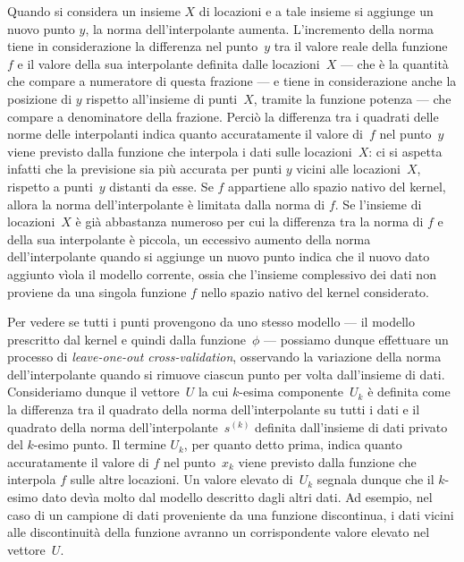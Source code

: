 Quando si considera un insieme $X$ di locazioni e a tale insieme si aggiunge un nuovo punto $y$, la norma dell'interpolante aumenta.  L'incremento della norma tiene in considerazione la differenza nel punto~$y$ tra il valore reale della funzione~$f$ e il valore della sua interpolante definita dalle locazioni~$X$ --- che è la quantità che compare a numeratore di questa frazione --- e tiene in considerazione anche la posizione di $y$ rispetto all'insieme di punti~$X$, tramite la funzione potenza --- che compare a denominatore della frazione.  Perciò la differenza tra i quadrati delle norme delle interpolanti indica quanto accuratamente il valore di~$f$ nel punto~$y$ viene previsto dalla funzione che interpola i dati sulle locazioni~$X$: ci si aspetta infatti che la previsione sia più accurata per punti $y$ vicini alle locazioni~$X$, rispetto a punti~$y$ distanti da esse.
Se $f$ appartiene allo spazio nativo del kernel, allora la  norma  dell’interpolante è limitata dalla norma di $f$.  Se l’insieme di locazioni~$X$ è già abbastanza numeroso per cui la differenza tra la norma di $f$ e della sua interpolante è piccola,  un eccessivo aumento della norma dell’interpolante quando si aggiunge un nuovo punto indica che il nuovo dato aggiunto vìola il modello corrente, ossia che l’insieme complessivo dei dati non proviene da una singola funzione $f$ nello spazio nativo del kernel considerato.



Per vedere se tutti i punti provengono da uno stesso modello --- il modello prescritto dal kernel e quindi dalla funzione~$\phi$ --- possiamo dunque effettuare un processo di {\em leave-one-out cross-validation}, osservando la variazione della norma dell’interpolante quando si rimuove ciascun punto per volta dall’insieme di dati.  Consideriamo dunque il vettore~$U$ la cui $k$-esima componente~$U_k$ è definita come la differenza tra il quadrato della norma dell’interpolante su tutti i dati e il quadrato della norma dell’interpolante~$s^{(k)}$ definita dall’insieme di dati privato del $k$-esimo punto.  Il termine $U_k$, per quanto detto prima, indica quanto accuratamente il valore di $f$ nel punto~$x_k$ viene previsto dalla funzione che interpola $f$ sulle altre locazioni.  Un valore elevato di~$U_k$ segnala dunque che il $k$-esimo dato devìa molto dal modello descritto dagli altri dati.  Ad esempio, nel caso di un campione di dati proveniente da una funzione discontinua, i dati vicini alle discontinuità della funzione avranno un corrispondente valore elevato nel vettore~$U$. %

